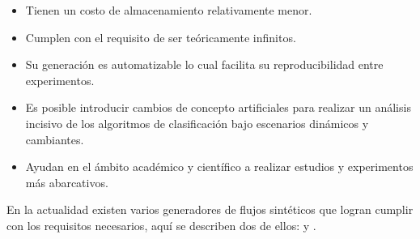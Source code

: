 \begin{itemize}

	\item Tienen un costo de almacenamiento relativamente menor.

	\item Cumplen con el requisito de ser teóricamente infinitos.

	\item Su generación es automatizable lo cual facilita su reproducibilidad
	      entre experimentos.

	\item Es posible introducir cambios de concepto artificiales para realizar un
	      análisis incisivo de los algoritmos de clasificación bajo escenarios
	      dinámicos y cambiantes.

	\item Ayudan en el ámbito académico y científico a realizar estudios y
	      experimentos más abarcativos.

\end{itemize}

En la actualidad existen varios generadores de flujos sintéticos que logran
cumplir con los requisitos necesarios, aquí se describen dos de ellos:
 y .

